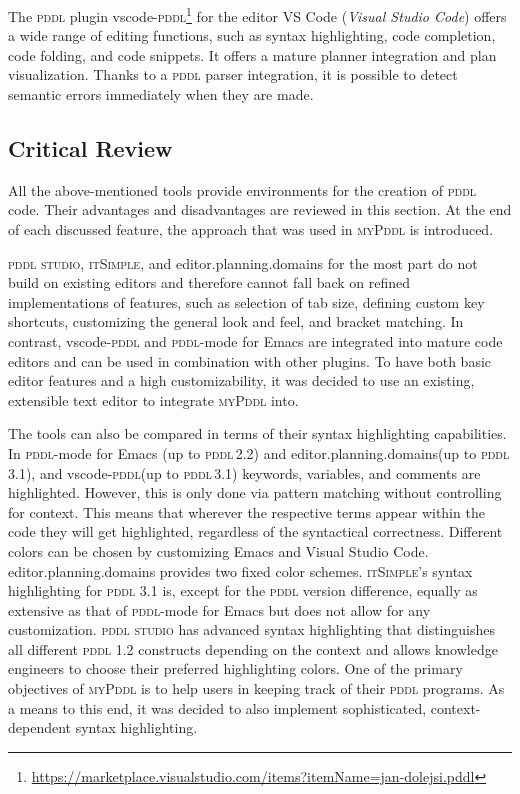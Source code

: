 \documentclass[runningheads]{llncs}
\newcommand{\mypddl}{\textsc{myPddl}\xspace}
\newcommand{\pddlstudio}{\textsc{pddl studio}\xspace}
\newcommand{\epd}{editor.planning.domains\xspace}
\newcommand{\itsimple}{\textsc{itSimple}\xspace}
\newcommand{\pddlmode}{\textsc{pddl}-mode\xspace}
\newcommand{\vscode}{vscode-\textsc{pddl}\xspace}
\newcommand{\pddl}{\textsc{pddl}\xspace}
\begin{document}
The \pddl plugin
\vscode\footnote{\url{https://marketplace.visualstudio.com/items?itemName=jan-dolejsi.pddl}}
for the editor VS Code (\emph{Visual Studio Code}) offers a wide range
of editing functions, such as syntax highlighting, code completion,
code folding, and code snippets. It offers a mature planner
integration and plan visualization. Thanks to a \pddl parser
integration, it is possible to detect semantic errors immediately when
they are made.

\subsection{Critical Review}
\label{sec-3-4}

All the above-mentioned tools provide environments for the creation of
\pddl code. Their advantages and disadvantages are reviewed in this
section. At the end of each discussed feature, the approach that was
used in \mypddl is introduced.

\pddlstudio, \itsimple, and \epd for the most part do not build on
existing editors and therefore cannot fall back on refined
implementations of features, such as selection of tab size, defining
custom key shortcuts, customizing the general look and feel, and
bracket matching. In contrast, \vscode and \pddlmode for Emacs are
integrated into mature code editors and can be used in combination
with other plugins. To have both basic editor features and a high
customizability, it was decided to use an existing, extensible text
editor to integrate \mypddl into.

The tools can also be compared in terms of their syntax highlighting
capabilities. In \pddlmode for Emacs (up to \pddl\,2.2) and \epd (up
to \pddl\,3.1), and \vscode (up to \pddl\,3.1) keywords, variables,
and comments are highlighted. However, this is only done via pattern
matching without controlling for context. This means that wherever the
respective terms appear within the code they will get highlighted,
regardless of the syntactical correctness. Different colors can be
chosen by customizing Emacs and Visual Studio Code. \epd provides two
fixed color schemes. \itsimple's syntax highlighting for \pddl 3.1 is,
except for the \pddl version difference, equally as extensive as that
of \pddlmode for Emacs but does not allow for any customization.
\pddlstudio has advanced syntax highlighting that distinguishes all
different \pddl 1.2 constructs depending on the context and allows
knowledge engineers to choose their preferred highlighting colors. One
of the primary objectives of \mypddl is to help users in keeping track
of their \pddl programs. As a means to this end, it was decided to
also implement sophisticated, context-dependent syntax highlighting.
\end{document}
